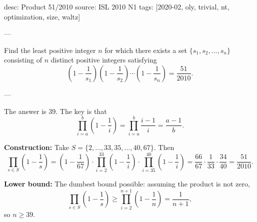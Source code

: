 desc: Product 51/2010
source: ISL 2010 N1
tags: [2020-02, oly, trivial, nt, optimization, size, waltz]

---

Find the least positive integer $n$ for which there exists a set $\{s_1,s_2,\ldots,s_n\}$ consisting of $n$ distinct positive integers satisfying \[\left(1-\frac1{s_1}\right)\left(1-\frac1{s_2}\right)\cdots\left(1-\frac1{s_n}\right)=\frac{51}{2010}.\]


---

The answer is $39$. The key is that \[\prod_{i=a}^b\left(1-\frac1i\right)=\prod_{i=a}^b\frac{i-1}i=\frac{a-1}b.\]

\bigskip

\textbf{Construction:} Take $S=\{2,\ldots,33,35,\ldots,40,67\}$. Then \[\prod_{s\in S}\left(1-\frac1s\right)=\left(1-\frac1{67}\right)\cdot\prod_{i=2}^{33}\left(1-\frac1i\right)\cdot\prod_{i=35}^{40}\left(1-\frac1i\right)=\frac{66}{67}\cdot\frac1{33}\cdot\frac{34}{40}=\frac{51}{2010}.\]

\bigskip

\textbf{Lower bound:} The dumbest bound possible: assuming the product is not zero, \[\prod_{s\in S}\left(1-\frac1s\right)\ge\prod_{i=2}^{n+1}\left(1-\frac1n\right)=\frac1{n+1},\]
so $n\ge39$.

